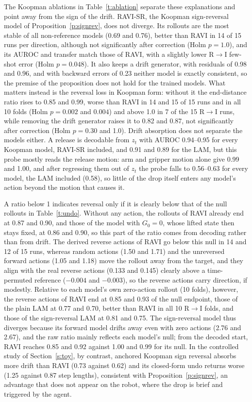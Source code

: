 \documentclass{jcse}
\newcommand{\method}{RAVI}
\begin{document}
The Koopman ablations in Table~\ref{t:ablation} separate these explanations and point away from the sign of the drift.
{\method}-SR, the Koopman sign-reversal model of Proposition~\ref{p:signrev}, does not diverge. Its rollouts are the most stable of all non-reference models (0.69 and 0.76), better than {\method} in 14 of 15 runs per direction, although not significantly after correction (Holm $p=1.0$), and its AUROC and transfer match those of {\method}, with a slightly lower R$\to$I few-shot error (Holm $p=0.048$).
It also keeps a drift generator, with residuals of 0.98 and 0.96, and with backward errors of 0.23 neither model is exactly consistent, so the premise of the proposition does not hold for the trained models.
What matters instead is the reversal loss in Koopman form: without it the end-distance ratio rises to 0.85 and 0.99, worse than {\method} in 14 and 15 of 15 runs and in all 10 folds (Holm $p=0.002$ and $0.004$) and above 1.0 in 7 of the 15 R$\to$I runs, while removing the drift generator raises it to 0.82 and 0.87, not significantly after correction (Holm $p=0.30$ and 1.0).
Drift absorption does not separate the models either. A release is decodable from $z_t$ with AUROC 0.94--0.95 for every Koopman model, {\method}-SR included, and 0.91 and 0.89 for the LAM, but this probe mostly reads the release motion: arm and gripper motion alone give 0.99 and 1.00, and after regressing them out of $z_t$ the probe falls to 0.56--0.63 for every model, the LAM included (0.58), so little of the drop itself enters any model's action beyond the motion that causes it.

A ratio below 1 indicates reversal only if it is clearly below that of the null rollouts in Table~\ref{t:undo}.
Without any action, the rollouts of {\method} already end at 0.87 and 0.90, and those of the model with $G_0=0$, whose lifted state then stays fixed, at 0.86 and 0.90, so this part of the ratio comes from decoding rather than from drift.
The derived reverse actions of {\method} go below this null in 14 and 12 of 15 runs, whereas random actions (1.50 and 1.71) and the unreversed forward actions (1.05 and 1.18) move the rollout away from the target, and they align with the real reverse actions (0.133 and 0.145) clearly above a time-permuted reference ($-0.004$ and $-0.003$), so the reverse actions carry direction, if modestly.
Relative to each model's own zero-action rollout (10 folds), however, the reverse actions of {\method} end at 0.85 and 0.93 of the null endpoint, those of the plain LAM at 0.77 and 0.70, better than {\method} in all 10 R$\to$I folds, and those of the sign-reversal LAM at 0.81 and 0.75. The sign-reversal model thus diverges because its forward model drifts away even with zero actions (2.76 and 2.67), and the raw ratio mainly reflects each model's null; from the decoded start, {\method} reaches 0.85 and 0.92 against 1.00 and 0.99 for its null.
In the controlled study of Section~\ref{s:toy}, by contrast, anchored Koopman sign reversal absorbs more drift than {\method} (0.73 against 0.62) and its closed-form undo returns worse (1.25 against 0.87 step lengths), consistent with Proposition~\ref{p:signrev}, an advantage that does not appear on the robot, where the drop is brief and triggered by the agent.
\end{document}
